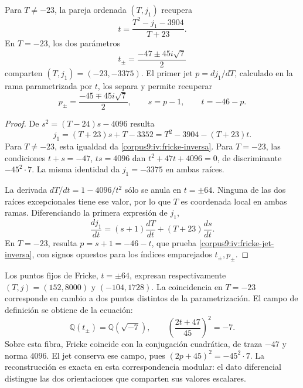 \begin{proposition}
\label{corpus9:iv:fricke-jet}
Para \(T\ne-23\), la pareja ordenada \((T,j_1)\) recupera
\begin{equation}
 t=\frac{T^2-j_1-3904}{T+23}.
 \label{corpus9:iv:fricke-inversa}
\end{equation}
En \(T=-23\), los dos parámetros
\[
 t_\pm=\frac{-47\pm45i\sqrt7}{2}
\]
comparten \((T,j_1)=(-23,-3375)\). El primer jet
\(p=dj_1/dT\), calculado en la rama parametrizada por \(t\),
los separa y permite recuperar
\begin{equation}
 p_\pm=\frac{-45\mp45i\sqrt7}{2},\qquad
 s=p-1,\qquad t=-46-p.
 \label{corpus9:iv:fricke-jet-inversa}
\end{equation}
\end{proposition}
\begin{proof}
De \(s^2=(T-24)s-4096\) resulta
\[
 j_1=(T+23)s+T-3352
     =T^2-3904-(T+23)t.
\]
Para \(T\ne-23\), esta igualdad da
\eqref{corpus9:iv:fricke-inversa}. Para \(T=-23\),
las condiciones \(t+s=-47\), \(ts=4096\) dan
\(t^2+47t+4096=0\), de discriminante \(-45^2\cdot7\).
La misma identidad da \(j_1=-3375\) en ambas raíces.

La derivada \(dT/dt=1-4096/t^2\) sólo se anula en
\(t=\pm64\). Ninguna de las dos raíces excepcionales tiene ese
valor, por lo que \(T\) es coordenada local en ambas ramas.
Diferenciando la primera expresión de \(j_1\),
\[
 \frac{dj_1}{dt}
  =(s+1)\frac{dT}{dt}+(T+23)\frac{ds}{dt}.
\]
En \(T=-23\), resulta \(p=s+1=-46-t\), que prueba
\eqref{corpus9:iv:fricke-jet-inversa}, con signos opuestos
para los índices emparejados \(t_\pm,p_\pm\).
\end{proof}

Los puntos fijos de Fricke, \(t=\pm64\), expresan respectivamente
\((T,j)=(152,8000)\) y \((-104,1728)\). La coincidencia en
\(T=-23\) corresponde en cambio a dos puntos distintos de la
parametrización. El campo de definición se obtiene de la ecuación:
\[
 \mathbb Q(t_\pm)=\mathbb Q(\sqrt{-7}),\qquad
 \left(\frac{2t+47}{45}\right)^2=-7.
\]
Sobre esta fibra, Fricke coincide con la conjugación cuadrática,
de traza \(-47\) y norma \(4096\). El jet conserva ese campo,
pues \((2p+45)^2=-45^2\cdot7\). La reconstrucción es exacta
en esta correspondencia modular: el dato diferencial distingue
las dos orientaciones que comparten sus valores escalares.
